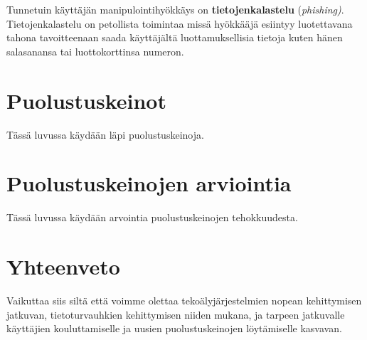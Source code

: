 Tunnetuin käyttäjän manipulointihyökkäys on \textbf{tietojenkalastelu} (\textit{phishing)}. Tietojenkalastelu on petollista toimintaa missä hyökkääjä esiintyy luotettavana tahona tavoitteenaan saada käyttäjältä luottamuksellisia tietoja kuten hänen salasanansa tai luottokorttinsa numeron.

\section*{Puolustuskeinot}

Tässä luvussa käydään läpi puolustuskeinoja.

\section*{Puolustuskeinojen arviointia}

Tässä luvussa käydään arvointia puolustuskeinojen tehokkuudesta.

\section*{Yhteenveto}

Vaikuttaa siis siltä että voimme olettaa tekoälyjärjestelmien nopean kehittymisen jatkuvan, tietoturvauhkien kehittymisen niiden mukana, ja tarpeen jatkuvalle käyttäjien kouluttamiselle ja uusien puolustuskeinojen löytämiselle kasvavan.